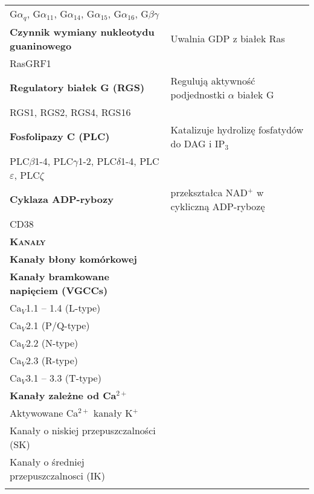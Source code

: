 \begin{scriptsize}
\begin{center}
\begin{longtable}{p{8cm}p{8cm}}
\hspace{0.25cm} G$\alpha$$_q$, G$\alpha$$_{11}$, G$\alpha$$_{14}$, G$\alpha$$_{15}$, G$\alpha$$_{16}$, G$\beta \gamma$& \\
\textbf{Czynnik wymiany nukleotydu guaninowego}& Uwalnia GDP z białek Ras\\[0.1em]
\hspace{0.25cm} RasGRF1& \\
\textbf{Regulatory białek G (RGS)}& Regulują aktywność podjednostki $\alpha$ białek G\\[0.1em]
\hspace{0.25cm} RGS1, RGS2, RGS4, RGS16&\\
\textbf{Fosfolipazy C (PLC)}& Katalizuje hydrolizę fosfatydów do DAG i IP$_3$\\[0.1em]
\hspace{0.25cm} PLC$\beta$1-4, PLC$\gamma$1-2, PLC$\delta$1-4, PLC$\varepsilon$, PLC$\zeta$& \\
\textbf{Cyklaza ADP-rybozy}& przekształca NAD$^+$ w cykliczną ADP-rybozę\\[0.1em]
\hspace{0.25cm} CD38& \\
\multicolumn{2}{l}{\textsc{\textbf{Kanały}}} \\[0.175em]
\textbf{Kanały błony komórkowej}& \\[0.15em]
\hspace{0.25cm} \textbf{Kanały bramkowane napięciem (VGCCs)}& \\[0.1em]
\hspace{0.75cm} Ca$_V$1.1 -- 1.4 (L-type)& \\
\hspace{0.75cm} Ca$_V$2.1 (P/Q-type)& \\
\hspace{0.75cm} Ca$_V$2.2 (N-type)& \\
\hspace{0.75cm} Ca$_V$2.3 (R-type)& \\
\hspace{0.75cm} Ca$_V$3.1 -- 3.3 (T-type)& \\
\hspace{0.25cm} \textbf{Kanały zależne od Ca$^{2+}$}& \\[0.1em]
\hspace{0.75cm} Aktywowane Ca$^{2+}$ kanały K$^+$& \\
\hspace{1cm} Kanały o niskiej przepuszczalności (SK)& \\
\hspace{1cm} Kanały o średniej przepuszczalnosci (IK)& \\
$$
\end{longtable}
\end{center}
\end{scriptsize}
